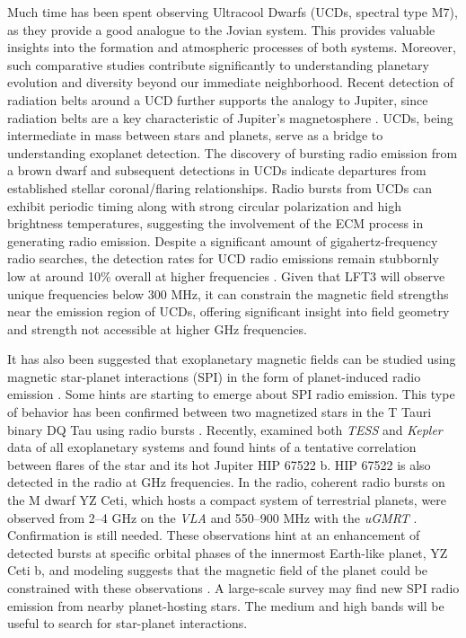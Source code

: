 Much time has been spent observing Ultracool Dwarfs (UCDs, spectral type M7), as they provide a good analogue to the Jovian system. This provides valuable insights into the formation and atmospheric processes of both systems. Moreover, such comparative studies contribute significantly to understanding planetary evolution and diversity beyond our immediate neighborhood. Recent detection of radiation belts around a UCD further supports the analogy to Jupiter, since radiation belts are a key characteristic of Jupiter's magnetosphere \citep{joe_nature_review}. UCDs, being intermediate in mass between stars and planets, serve as a bridge to understanding exoplanet detection. The discovery of bursting radio emission from a brown dwarf and subsequent detections in UCDs indicate departures from established stellar coronal/flaring relationships. Radio bursts from UCDs can exhibit periodic timing \citep{hallinan_rotational_2006} along with strong circular polarization and high brightness temperatures, suggesting the involvement of the ECM process in generating radio emission. Despite a significant amount of gigahertz-frequency radio searches, the detection rates for UCD radio emissions remain stubbornly low at around 10\% overall at higher frequencies \citep{lynch_radio_2016}. Given that LFT3 will observe unique frequencies below 300 MHz, it can constrain the magnetic field strengths near the emission region of UCDs, offering significant insight into field geometry and strength not accessible at higher GHz frequencies.

It has also been suggested that exoplanetary magnetic fields can be studied using magnetic star-planet interactions (SPI) in the form of planet-induced radio emission \citep{Cuntz2000,Lanza2009,joe_nature_review}. Some hints are starting to emerge about SPI radio emission. This type of behavior has been confirmed between two magnetized stars in the T Tauri binary DQ Tau using radio bursts \citep{Salter2008}. Recently, \citep{Ilin2022,Ilin2024} examined both \textit{TESS} and \textit{Kepler} data of all exoplanetary systems and found hints of a tentative correlation between flares of the star and its hot Jupiter HIP 67522 b. HIP 67522 is also detected in the radio at GHz frequencies. In the radio, coherent radio bursts on the M dwarf YZ Ceti, which hosts a compact system of terrestrial planets, were observed from 2--4 GHz on the \textit{VLA} \citep{Pineda2023} and 550--900 MHz with the \textit{uGMRT} \citep{Trigilio2023}. Confirmation is still needed. These observations hint at an enhancement of detected bursts at specific orbital phases of the innermost Earth-like planet, YZ Ceti b, and modeling suggests that the magnetic field of the planet could be constrained with these observations \citep{Pineda2023,Trigilio2023}. A large-scale survey may find new SPI radio emission from nearby planet-hosting stars. The medium and high bands will be useful to search for star-planet interactions. 

